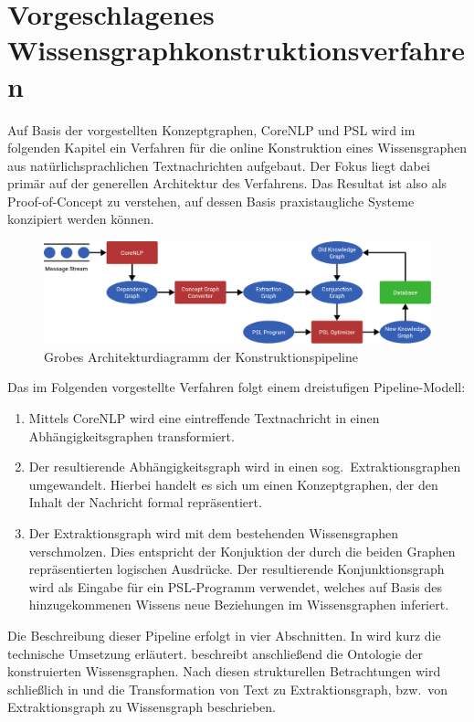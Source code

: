 %
\chapter{Vorgeschlagenes Wissensgraph\-konstruktions\-verfahren}%
\label{sec:text2kg}

Auf Basis der vorgestellten Konzeptgraphen, CoreNLP und PSL wird im folgenden Kapitel ein Verfahren für die online Konstruktion eines Wissensgraphen aus natürlichsprachlichen Textnachrichten aufgebaut.
Der Fokus liegt dabei primär auf der generellen Architektur des Verfahrens.
Das Resultat ist also als Proof-of-Concept zu verstehen, auf dessen Basis praxistaugliche Systeme konzipiert werden können.

\begin{figure}[h]
	\includegraphics[width=\textwidth]{gfx/text2kg/architecture.pdf}
	\caption{Grobes Architekturdiagramm der Konstruktionspipeline}\label{fig:text2kg:architecture}
\end{figure}
Das im Folgenden vorgestellte Verfahren folgt einem dreistufigen Pipeline-Modell:
\begin{enumerate}
	\item Mittels CoreNLP wird eine eintreffende Textnachricht in einen Abhängigkeitsgraphen transformiert.
	\item Der resultierende Abhängigkeitsgraph wird in einen sog.\ Extraktionsgraphen umgewandelt.
		Hierbei handelt es sich um einen Konzeptgraphen, der den Inhalt der Nachricht formal repräsentiert.
	\item Der Extraktionsgraph wird mit dem bestehenden Wissensgraphen verschmolzen.
		Dies entspricht der Konjuktion der durch die beiden Graphen repräsentierten logischen Ausdrücke.
		Der resultierende Konjunktionsgraph wird als Eingabe für ein PSL-Programm verwendet, welches auf Basis des hinzugekommenen Wissens neue Beziehungen im Wissensgraphen inferiert.
\end{enumerate}
Die Beschreibung dieser Pipeline erfolgt in vier Abschnitten.
In  wird kurz die technische Umsetzung erläutert.
 beschreibt anschließend die Ontologie der konstruierten Wissensgraphen.
Nach diesen strukturellen Betrachtungen wird schließlich in  und  die Transformation von Text zu Extraktionsgraph, bzw.\ von Extraktionsgraph zu Wissensgraph beschrieben.

